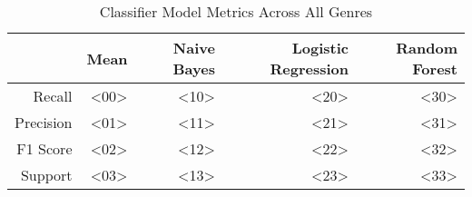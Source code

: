 \begin{table}[h]
    \centering
    \begin{tabular}{r|r|r|r|r}
         & Mean & Naive Bayes & Logistic Regression & Random Forest \\\hline
        Recall     & <00> & <10> & <20> & <30> \\
        Precision  & <01> & <11> & <21> & <31> \\
        F1 Score   & <02> & <12> & <22> & <32> \\
        Support    & <03> & <13> & <23> & <33>
\end{tabular}
    \caption{Classifier Model Metrics Across All Genres}
    \label{tab:mode_aggregation_metrics_table}
\end{table}